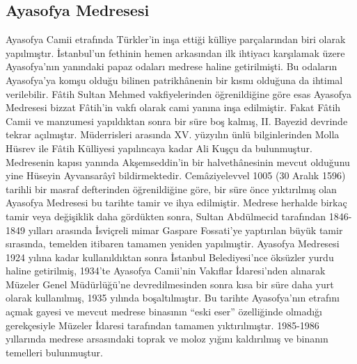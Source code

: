 \subsection{Ayasofya Medresesi}
\indent\indent Ayasofya Camii etrafında Türkler’in inşa ettiği külliye parçalarından biri olarak yapılmıştır. İstanbul’un fethinin hemen arkasından ilk ihtiyacı karşılamak üzere Ayasofya’nın yanındaki papaz odaları medrese haline getirilmişti. Bu odaların Ayasofya’ya komşu olduğu bilinen patrikhânenin bir kısmı olduğuna da ihtimal verilebilir. Fâtih Sultan Mehmed vakfiyelerinden öğrenildiğine göre esas Ayasofya Medresesi bizzat Fâtih’in vakfı olarak cami yanına inşa edilmiştir. Fakat Fâtih Camii ve manzumesi yapıldıktan sonra bir süre boş kalmış, II. Bayezid devrinde tekrar açılmıştır. Müderrisleri arasında XV. yüzyılın ünlü bilginlerinden Molla Hüsrev ile Fâtih Külliyesi yapılıncaya kadar Ali Kuşçu da bulunmuştur. Medresenin kapısı yanında Akşemseddin’in bir halvethânesinin mevcut olduğunu yine Hüseyin Ayvansarâyî bildirmektedir.\newline
{} Cemâziyelevvel 1005 (30 Aralık 1596) tarihli bir masraf defterinden öğrenildiğine göre, bir süre önce yıktırılmış olan Ayasofya Medresesi bu tarihte tamir ve ihya edilmiştir. Medrese herhalde birkaç tamir veya değişiklik daha gördükten sonra, Sultan Abdülmecid tarafından 1846-1849 yılları arasında İsviçreli mimar Gaspare Fossati’ye yaptırılan büyük tamir sırasında, temelden itibaren tamamen yeniden yapılmıştir.\newline
\indent Ayasofya Medresesi 1924 yılına kadar kullanıldıktan sonra İstanbul Belediyesi’nce öksüzler yurdu haline getirilmiş, 1934’te Ayasofya Camii’nin Vakıflar İdaresi’nden alınarak Müzeler Genel Müdürlüğü’ne devredilmesinden sonra kısa bir süre daha yurt olarak kullanılmış, 1935 yılında boşaltılmıştır. Bu tarihte Ayasofya’nın etrafını açmak gayesi ve mevcut medrese binasının “eski eser” özelliğinde olmadığı gerekçesiyle Müzeler İdaresi tarafından tamamen yıktırılmıştır. 1985-1986 yıllarında medrese arsasındaki toprak ve moloz yığını kaldırılmış ve binanın temelleri bulunmuştur.\cite{dia_9}\newline
